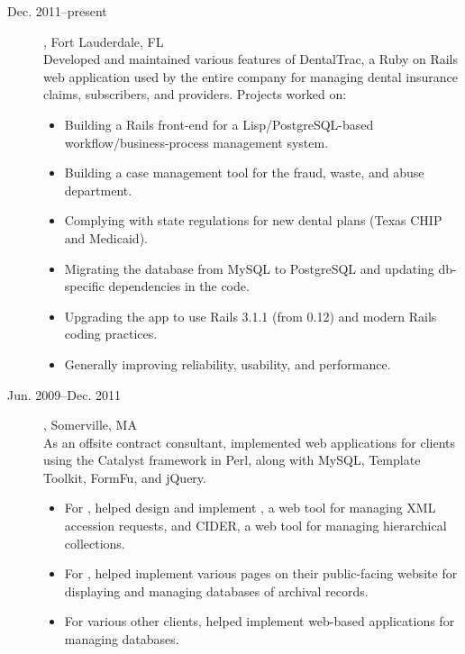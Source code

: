 \documentclass{article}
\begin{document}
\begin{description}
\item[Dec. 2011--present]
{\large {}}, Fort Lauderdale, FL \\
Developed and maintained various features of DentalTrac, a Ruby on
Rails web application used by the entire company for managing dental
insurance claims, subscribers, and providers.  Projects worked on:
\begin{itemize}
  \item Building a Rails front-end for a Lisp/PostgreSQL-based
    workflow/business-process management system.
  \item Building a case management tool for the fraud, waste, and
    abuse department.
  \item Complying with state regulations for new dental plans (Texas
    CHIP and Medicaid).
  \item Migrating the database from MySQL to PostgreSQL and updating
    db-specific dependencies in the code.
  \item Upgrading the app to use Rails 3.1.1 (from 0.12) and modern
    Rails coding practices.
  \item Generally improving reliability, usability, and performance.
\end{itemize}

\item[Jun. 2009--Dec. 2011]
{\large {}},
Somerville, MA \\
As an offsite contract consultant, implemented web applications for
clients using the Catalyst framework in Perl, along with MySQL,
Template Toolkit, FormFu, and jQuery.
\begin{itemize}
\item For , helped design and implement
  , a web tool for
  managing XML accession requests, and CIDER, a web tool for managing
  hierarchical collections.
\item For , helped implement various pages on their public-facing
  website for displaying and managing databases of archival records.
\item For various other clients, helped implement web-based
  applications for managing databases.
\end{itemize}


\end{description}
\end{document}
